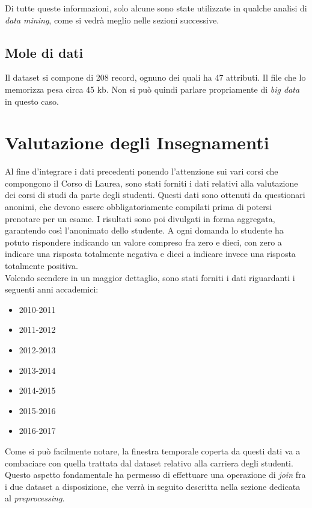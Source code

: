 Di tutte queste informazioni, solo alcune sono state utilizzate in qualche analisi di \textit{data mining}, come si vedrà meglio nelle sezioni successive.

\subsection{Mole di dati}

Il dataset si compone di 208 record, ognuno dei quali ha 47 attributi. Il file che lo memorizza pesa circa 45 kb. Non si può quindi parlare propriamente di \textit{big data} in questo caso.

\section{Valutazione degli Insegnamenti}

Al fine d'integrare i dati precedenti ponendo l'attenzione sui vari corsi che compongono il Corso di Laurea, sono stati forniti i dati relativi alla valutazione dei corsi di studi da parte degli studenti. Questi dati sono ottenuti da questionari anonimi, che devono essere obbligatoriamente compilati prima di potersi prenotare per un esame. I risultati sono poi divulgati in forma aggregata, garantendo così l'anonimato dello studente. A ogni domanda lo studente ha potuto rispondere indicando un valore compreso fra zero e dieci, con zero a indicare una risposta totalmente negativa e dieci a indicare invece una risposta totalmente positiva.\\

Volendo scendere in un maggior dettaglio, sono stati forniti i dati riguardanti i seguenti anni accademici:

\begin{itemize}
	\item 2010-2011
	\item 2011-2012
	\item 2012-2013
	\item 2013-2014
	\item 2014-2015
	\item 2015-2016
	\item 2016-2017
\end{itemize}

Come si può facilmente notare, la finestra temporale coperta da questi dati va a combaciare con quella trattata dal dataset relativo alla carriera degli studenti. Questo aspetto fondamentale ha permesso di effettuare una operazione di \textit{join} fra i due dataset a disposizione, che verrà in seguito descritta nella sezione dedicata al \textit{preprocessing}.

